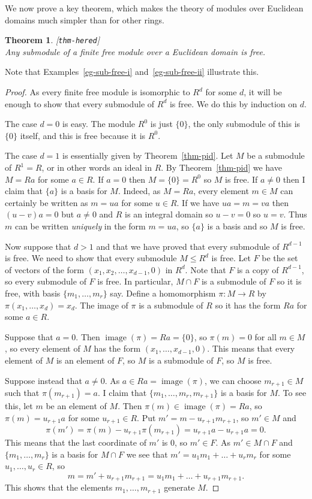 \documentclass{amsart}
\newcommand{\lbl}[1]{\label{#1}\textup{[\texttt{#1}]}\ \\}
\newcommand{\lbl}{\label}
\newcommand{\img}       {\operatorname{image}}
\newcommand{\xra}       {\xrightarrow}
\renewcommand{\:}{\colon}
\newtheorem{theorem}{Theorem}[section]
\theoremstyle{definition}
\begin{document}
We now prove a key theorem, which makes the theory of modules over
Euclidean domains much simpler than for other rings.
\begin{theorem}\lbl{thm-hered}
 Any submodule of a finite free module over a Euclidean domain is
 free.
\end{theorem}
Note that Examples~\ref{eg-sub-free-i} and~\ref{eg-sub-free-ii}
illustrate this.
\begin{proof}
 As every finite free module is isomorphic to $R^d$ for some $d$, it
 will be enough to show that every submodule of $R^d$ is free.  We do
 this by induction on $d$.  

 The case $d=0$ is easy.  The module $R^0$ is just $\{0\}$, the only
 submodule of this is $\{0\}$ itself, and this is free because it is
 $R^0$.

 The case $d=1$ is essentially given by Theorem~\ref{thm-pid}.  Let
 $M$ be a submodule of $R^1=R$, or in other words an ideal in $R$.  By
 Theorem~\ref{thm-pid} we have $M=Ra$ for some $a\in R$.  If $a=0$
 then $M=\{0\}=R^0$ so $M$ is free.  If $a\neq 0$ then I claim that
 $\{a\}$ is a basis for $M$.  Indeed, as $M=Ra$, every element
 $m\in M$ can certainly be written as $m=ua$ for some $u\in R$.  If we
 have $ua=m=va$ then $(u-v)a=0$ but $a\neq 0$ and $R$ is an integral
 domain so $u-v=0$ so $u=v$.  Thus $m$ can be written \emph{uniquely}
 in the form $m=ua$, so $\{a\}$ is a basis and so $M$ is free.

 Now suppose that $d>1$ and that we have proved that every submodule
 of $R^{d-1}$ is free.  We need to show that every submodule
 $M\leq R^d$ is free.  Let $F$ be the set of vectors of the form
 $(x_1,x_2,\ldots,x_{d-1},0)$ in $R^d$.  Note that $F$ is a copy of
 $R^{d-1}$, so every submodule of $F$ is free.  In particular,
 $M\cap F$ is a submodule of $F$ so it is free, with basis
 $\{m_1,\ldots,m_r\}$ say.  Define a homomorphism $\pi\:M\xra{}R$ by
 $\pi(x_1,\ldots,x_d)=x_d$.  The image of $\pi$ is a submodule of $R$
 so it has the form $Ra$ for some $a\in R$.

 Suppose that $a=0$.  Then $\img(\pi)=Ra=\{0\}$, so $\pi(m)=0$ for all
 $m\in M$, so every element of $M$ has the form
 $(x_1,\ldots,x_{d-1},0)$.  This means that every element of $M$ is an
 element of $F$, so $M$ is a submodule of $F$, so $M$ is free.

 Suppose instead that $a\neq 0$.  As $a\in Ra=\img(\pi)$, we can
 choose $m_{r+1}\in M$ such that $\pi(m_{r+1})=a$.  I claim that
 $\{m_1,\ldots,m_r,m_{r+1}\}$ is a basis for $M$.  To see this, let
 $m$ be an element of $M$.  Then $\pi(m)\in\img(\pi)=Ra$, so
 $\pi(m)=u_{r+1}a$ for some $u_{r+1}\in R$.  Put
 $m'=m-u_{r+1}m_{r+1}$, so $m'\in M$ and
 \[ \pi(m') = \pi(m) - u_{r+1}\pi(m_{r+1}) = 
      u_{r+1} a - u_{r+1} a = 0.
 \]
 This means that the last coordinate of $m'$ is $0$, so $m'\in F$.  As
 $m'\in M\cap F$ and $\{m_1,\ldots,m_r\}$ is a basis for $M\cap F$ we
 see that $m'=u_1m_1+\ldots+u_rm_r$ for some $u_1,\ldots,u_r\in R$, so
 \[ m=m'+u_{r+1}m_{r+1}=u_1m_1+\ldots+u_{r+1}m_{r+1}. \]
 This shows that the elements $m_1,\ldots,m_{r+1}$ generate $M$.


\end{proof}
\end{document}
